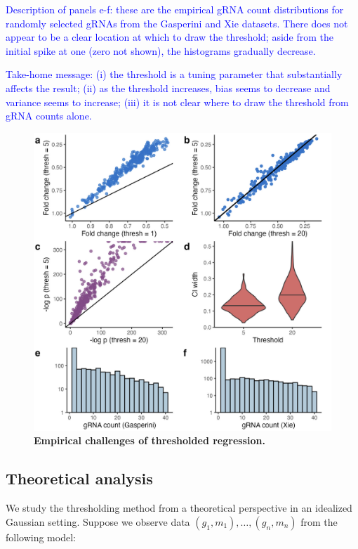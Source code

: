 \documentclass[12pt]{article}
\newcommand{\blue}[1]{\textcolor{blue}{#1}}
\begin{document}
\blue{Description of panels e-f: these are the empirical gRNA count distributions for randomly selected gRNAs from the Gasperini and Xie datasets. There does not appear to be a clear location at which to draw the threshold; aside from the initial spike at one (zero not shown), the histograms gradually decrease.}

\blue{Take-home message: (i) the threshold is a tuning parameter that substantially affects the result; (ii) as the threshold increases, bias seems to decrease and variance seems to increase; (iii) it is not clear where to draw the threshold from gRNA counts alone.}

\begin{figure}[h!]
	\centering
	\includegraphics[width=1\linewidth]{../../figures/thresholding_empirical/plot}
	\caption{\textbf{Empirical challenges of thresholded regression.}}
	\label{thresholding_empirical}
\end{figure}
\newpage

\subsection{Theoretical analysis}

We study the thresholding method from a theoretical perspective in an idealized Gaussian setting. Suppose we observe data $(g_1, m_1), \dots, (g_n, m_n)$ from the following model:
\end{document}

